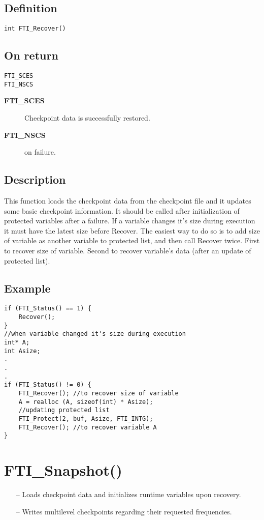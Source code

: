 \documentclass{refrep}
\begin{document}
\subsection*{Definition}
\begin{lstlisting}[frame=single]
int FTI_Recover()
\end{lstlisting}
\subsection*{On return}
\begin{lstlisting}[frame=single]
FTI_SCES
FTI_NSCS
\end{lstlisting}
\begin{description}
\item[\textbf{FTI\_SCES}] Checkpoint data is successfully restored.
\item[\textbf{FTI\_NSCS}] on failure.
\end{description}
\subsection*{Description}
This function loads the checkpoint data from the checkpoint file and it updates some basic checkpoint information. It should be called after initialization of protected variables after a failure. If a variable changes it's size during execution it must have the latest size before Recover. The easiest way to do so is to add size of variable as another variable to protected list, and then call Recover twice. First to recover size of variable. Second to recover variable's data (after an update of protected list).
\subsection*{Example}
\begin{center}
\begin{lstlisting}[frame=single]
if (FTI_Status() == 1) {
    Recover();
}
//when variable changed it's size during execution
int* A;
int Asize;
.
.
.
if (FTI_Status() != 0) {
    FTI_Recover(); //to recover size of variable
    A = realloc (A, sizeof(int) * Asize);
    //updating protected list
    FTI_Protect(2, buf, Asize, FTI_INTG);
    FTI_Recover(); //to recover variable A
}

\end{lstlisting}
\end{center}
\newpage
\section{\asciifamily FTI\_Snapshot()}\label{sec:ftisnapshot}
\begin{framed}
\begin{itemize}
\item[--] Loads checkpoint data and initializes runtime variables upon recovery.
\item[--] Writes multilevel checkpoints regarding their requested frequencies.
\end{itemize}
\end{framed}
\end{document}
